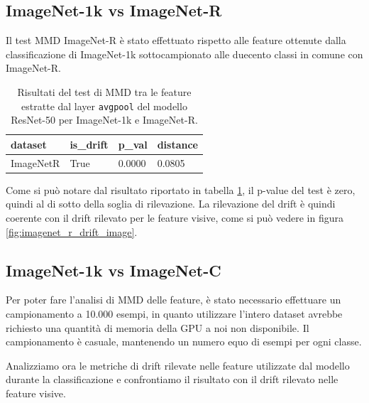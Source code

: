 \subsection{ImageNet-1k vs ImageNet-R}
Il test MMD ImageNet-R è stato effettuato rispetto alle feature ottenute dalla classificazione di ImageNet-1k sottocampionato alle duecento classi in comune con ImageNet-R.
\begin{table}[H]
  \centering
  \begin{tabular}{llll}
    \toprule
    dataset & is\_drift & p\_val & distance \\
    \midrule
    ImageNetR & True & 0.0000 & 0.0805 \\ 
    \bottomrule
  \end{tabular}
	\caption{Risultati del test di MMD tra le feature estratte dal layer \texttt{avgpool} del modello ResNet-50 per ImageNet-1k e ImageNet-R.}
	\label{tab:mmd_drift_report}
\end{table}
Come si può notare dal risultato riportato in tabella \ref{tab:mmd_drift_report}, il p-value del test è zero, quindi al di sotto della soglia di rilevazione. La rilevazione del drift è quindi coerente con il drift rilevato per le feature visive, come si può
vedere in figura \ref{fig:imagenet_r_drift_image}.
\subsection{ImageNet-1k vs ImageNet-C}
Per poter fare l'analisi di MMD delle feature, è stato necessario effettuare un campionamento a 10.000 esempi, in quanto utilizzare l'intero dataset avrebbe richiesto una quantità di memoria della GPU a noi non disponibile. Il campionamento è casuale, mantenendo un numero equo di esempi per ogni classe. 

Analizziamo ora le metriche di drift rilevate nelle feature utilizzate dal modello durante la classificazione e confrontiamo il risultato con il drift rilevato nelle feature visive.
